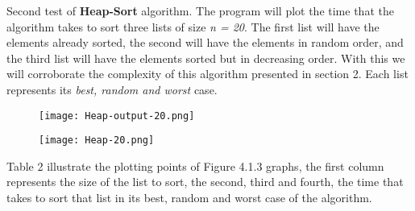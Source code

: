 {\bfseries\itshape\color{carmine}{Observation:}} {\itshape{}}

\pagebreak

Second test of {\bfseries Heap-Sort} algorithm. The program will plot the time that the algorithm takes to sort three lists of size {\itshape n = 20}. The first list will have the elements already sorted, the second will have the elements in random order, and the third list will have the elements sorted but in decreasing order. With this we will corroborate the complexity of this algorithm presented in section 2. Each list represents its {\itshape best, random and worst} case. \hfill \break

\begin{figure}[H]
\texttt{[image: Heap-output-20.png]}
\centering \linebreak {}
\end{figure}

\begin{figure}[H]
\texttt{[image: Heap-20.png]}
\centering \linebreak {}
\end{figure} \pagebreak

Table 2 illustrate the plotting points of Figure 4.1.3 graphs, the first column represents the size of the list to sort, the second, third and fourth, the time that takes to sort that list in its best, random and worst case of the algorithm. \hfill \break

